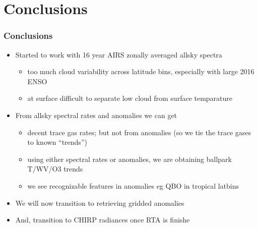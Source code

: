 \documentclass[10pt,t]{beamer}
\begin{document}


\section{Conclusions}
\begin{frame}
  \frametitle{Conclusions}
  \begin{itemize}
  \item Started to work with 16 year AIRS zonally averaged allsky spectra
  \begin{itemize}
    \item too much cloud variability across latitude bins, especially with large 2016 ENSO
    \item at surface difficult to separate low cloud from surface temparature
  \end{itemize}
  \item From allsky spectral rates and anomalies we can get
  \begin{itemize}
    \item  decent trace gas rates; but not from anomalies (so we tie the trace gases to known ``trends'')
    \item using either spectral rates or anomalies, we are obtaining ballpark T/WV/O3 trends
    \item we see recognizable features in anomalies eg QBO in tropical latbins
  \end{itemize}
  \item We will now transition to retrieving gridded anomalies
  \item And, transition to CHIRP radiances once RTA is finishe
  \end{itemize}
\end{frame}
\end{document}
